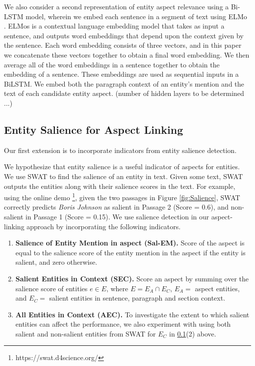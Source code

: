 We also consider a second representation of entity aspect relevance using a Bi-LSTM model, wherein we embed each sentence in a segment of text using ELMo \cite{elmo}. ELMos is a contextual language embedding model that takes as input a sentence, and outputs word embeddings that depend upon the context given by the sentence. Each word embedding consists of three vectors, and in this paper we concatenate these vectors together to obtain a final word embedding. We then average all of the word embeddings in a sentence together to obtain the embedding of a sentence. These embeddings are used as sequential inputs in a BiLSTM. We embed both the paragraph context of an entity's mention and the text of each candidate entity aspect. (number of hidden layers to be determined ...)

 
\subsection{Entity Salience for Aspect Linking}
\label{subsec:Entity Salience for Aspect Linking}
Our first extension is to incorporate indicators from entity salience detection.


We hypothesize that entity salience is a useful indicator of aspects for entities. We use SWAT \cite{swat}  to find the salience of an entity in text. Given some text, SWAT outputs the entities along with their salience scores in the text. For example, using the online demo \footnote{https://swat.d4science.org/}, given the two passages in Figure \ref{fig:Salience}, SWAT correctly predicts \textit{Boris Johnson} as salient in Passage 2 (Score = 0.6), and non-salient in Passage 1 (Score = 0.15). 
We use salience detection in our aspect-linking approach by incorporating the following indicators.


\begin{enumerate}
    \item \textbf{Salience of Entity Mention in aspect (Sal-EM).} Score of the aspect is equal to the salience score of the entity mention in the aspect if the entity is salient, and zero otherwise.
    
    \item \textbf{Salient Entities in Context (SEC).} Score an aspect by summing over the salience score of entities $e \in E$, where $E = E_A \cap E_C$, $E_A =$ aspect entities, and $E_C =$ salient entities in sentence, paragraph and section context.
    
    \item \textbf{All Entities in Context (AEC).} 
    To investigate the extent to which salient entities can affect the performance, we also experiment with using both salient and non-salient entities from SWAT for $E_C$ in \ref{subsec:Entity Salience for Aspect Linking}(2) above. 
\end{enumerate}


